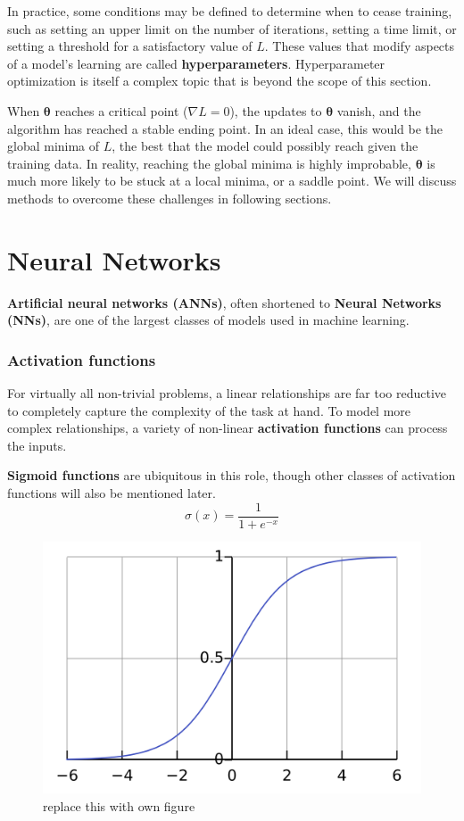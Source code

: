 \documentclass[12pt]{report}
\theoremstyle{definition}
\theoremstyle{remark}
\begin{document}
In practice, some conditions may be defined to determine when to cease training, such as setting an upper limit on the number of iterations, setting a time limit, or setting a threshold for a satisfactory value of $L$. These values that modify aspects of a model's learning are called \textbf{\glspl{hyperparameter}}. Hyperparameter optimization is itself a complex topic that is beyond the scope of this section.

When $\mathbf{\theta}$ reaches a critical point ($\nabla L = 0$), the updates to $\mathbf{\theta}$ vanish, and the algorithm has reached a stable ending point. In an ideal case, this would be the global minima of $L$, the best that the model could possibly reach given the training data. In reality, reaching the global minima is highly improbable, $\mathbf{\theta}$ is much more likely to be stuck at a local minima, or a saddle point. We will discuss methods to overcome these challenges in following sections.

\section{Neural Networks}

\textbf{Artificial neural networks (ANNs)}, often shortened to \textbf{Neural Networks (NNs)}, are one of the largest classes of models used in machine learning.

\subsubsection{Activation functions}

For virtually all non-trivial problems, a linear relationships are far too reductive to completely capture the complexity of the task at hand. To model more complex relationships, a variety of non-linear \textbf{activation functions} can process the inputs.

\textbf{Sigmoid functions} are ubiquitous in this role, though other classes of activation functions will also be mentioned later.
\begin{equation}
    \sigma(x) = \frac{1}{1+e^{-x}}
\end{equation}
\begin{figure}[h]
    \centering
    \includegraphics[width=0.5\linewidth]{figs/image.png}
    \caption{replace this with own figure}
    \label{fig:enter-label}
\end{figure}
\end{document}
